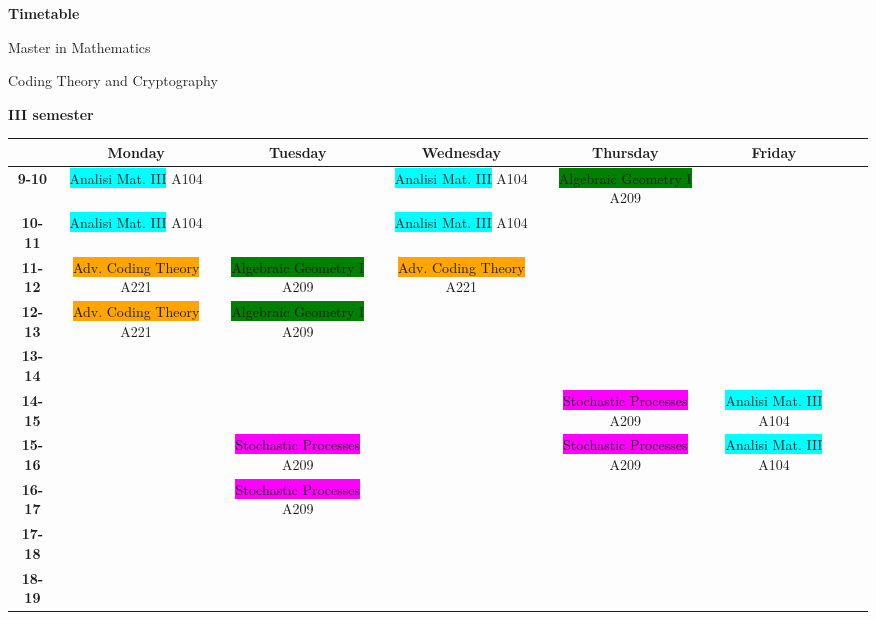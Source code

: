 \documentclass{article}
\newcommand{\bluelight}[1]{\colorbox{cyan}{#1}}
\newcommand{\orangelight}[1]{\colorbox{orange}{#1}}
\newcommand{\greenlight}[1]{\colorbox{green}{#1}}
\newcommand{\redlight}[1]{\colorbox{magenta}{#1}}
\begin{document}
\begin{landscape}

\begin{center}
\begin{huge}
	\textbf{Timetable}\\
\end{huge}
\bigskip
\begin{Large}
Master in Mathematics \\
\end{Large}
\begin{large}
Coding Theory and Cryptography\\

\end{large}
\end{center}


\begin{center}
\textbf{III semester}
\end{center}

\begin{table}[ht]
\centering
\begin{tabular}{|c|c|c|c|c|c|c|c|}\hline
& \textbf{Monday} & \textbf{Tuesday} & \textbf{Wednesday} & \textbf{Thursday} & \textbf{Friday}\\ \hline
\textbf{9-10} & \bluelight{Analisi Mat. III} A104 & & \bluelight{Analisi Mat. III} A104 & \greenlight{Algebraic Geometry I} A209 & \\ \hline
\textbf{10-11} & \bluelight{Analisi Mat. III} A104 & & \bluelight{Analisi Mat. III} A104 &  & \\ \hline
\textbf{11-12} & \orangelight{Adv. Coding Theory} A221 & \greenlight{Algebraic Geometry I} A209 & \orangelight{Adv. Coding Theory} A221& & \\ \hline
\textbf{12-13} & \orangelight{Adv. Coding Theory} A221 & \greenlight{Algebraic Geometry I} A209 & &  & \\ \hline
\textbf{13-14} & & & & & \\ \hline
\textbf{14-15} &   & &  & \redlight{Stochastic Processes} A209 & \bluelight{Analisi Mat. III} A104 \\ \hline
\textbf{15-16} &   & \redlight{Stochastic Processes} A209 &  & \redlight{Stochastic Processes} A209 & \bluelight{Analisi Mat. III} A104 \\ \hline
\textbf{16-17} &   & \redlight{Stochastic Processes} A209 &  & & \\ \hline
\textbf{17-18} &   &  & & & \\ \hline
\textbf{18-19} &   & &  & & \\ \hline
\end{tabular}
\end{table}

\end{landscape}
\end{document}
